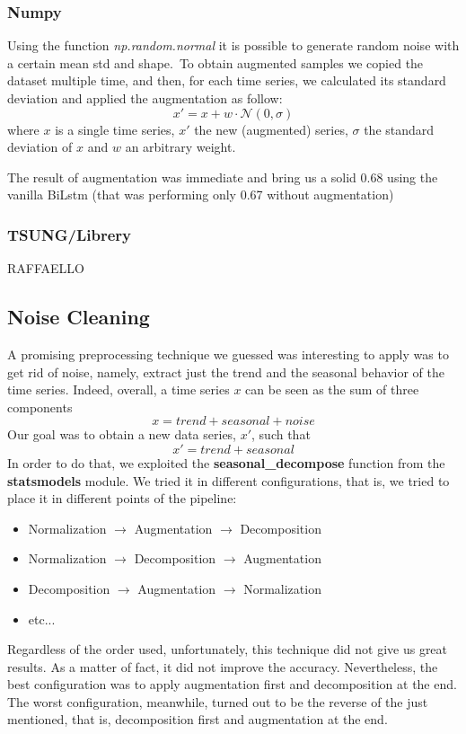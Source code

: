 \documentclass[11pt]{article}
\begin{document}
\subsubsection{Numpy}
Using the function \textit{np.random.normal} it is possible to generate random noise with a certain mean std and shape.\
To obtain augmented samples we copied the dataset multiple time, and then, for each time series, we calculated its standard deviation and applied the augmentation as follow:
\begin{equation*}
    x' = x + w\cdot\mathcal{N}(0, \sigma)
\end{equation*}
where $x$ is a single time series, $x'$ the new (augmented) series, $\sigma$ the standard deviation of $x$ and $w$ an arbitrary weight.

The result of augmentation was immediate and bring us a solid 0.68 using the vanilla BiLstm (that was performing only 0.67 without augmentation)
\subsubsection{TSUNG/Librery}
 RAFFAELLO
\subsection{Noise Cleaning}
A promising preprocessing technique we guessed was interesting to apply was to get rid of noise, namely, extract just the trend and the seasonal behavior of the time series. Indeed, overall, a time series $x$ can be seen as the sum of three components
\begin{equation*}
    x = trend + seasonal + noise
\end{equation*}
Our goal was to obtain a new data series, $x'$, such that
\begin{equation*}
    x' = trend + seasonal
\end{equation*}
In order to do that, we exploited the \textbf{seasonal\_decompose} function from the \textbf{statsmodels} module. We tried it in different configurations, that is, we tried to place it in different points of the pipeline:
\begin{itemize}
    \item Normalization $\rightarrow$ Augmentation $\rightarrow$ Decomposition
    \item Normalization $\rightarrow$ Decomposition $\rightarrow$ Augmentation
    \item Decomposition $\rightarrow$ Augmentation $\rightarrow$ Normalization
    \item etc...
\end{itemize}
Regardless of the order used, unfortunately, this technique did not give us great results. As a matter of fact, it did not improve the accuracy. Nevertheless, the best configuration was to apply augmentation first and decomposition at the end. The worst configuration, meanwhile, turned out to be the reverse of the just mentioned, that is, decomposition first and augmentation at the end.
\end{document}
